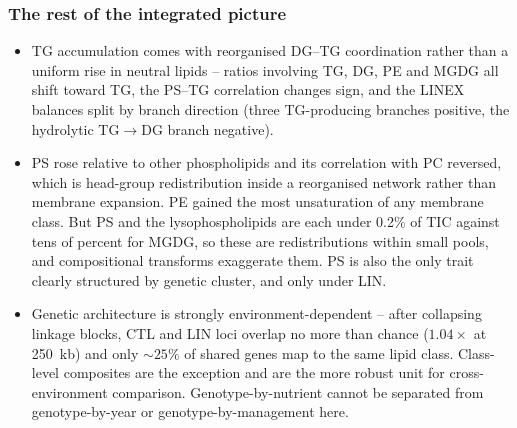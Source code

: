 \documentclass[11pt]{article}
\begin{document}
\subsubsection*{The rest of the integrated picture}
\begin{itemize}
  \item TG accumulation comes with reorganised DG--TG coordination rather than a
        uniform rise in neutral lipids -- ratios involving TG, DG, PE and MGDG all
        shift toward TG, the PS--TG correlation changes sign, and the LINEX
        balances split by branch direction (three TG-producing branches positive,
        the hydrolytic TG$\rightarrow$DG branch negative).
  \item PS rose relative to other phospholipids and its correlation with PC
        reversed, which is head-group redistribution inside a reorganised network
        rather than membrane expansion. PE gained the most unsaturation of any
        membrane class. But PS and the lysophospholipids are each under 0.2\% of
        TIC against tens of percent for MGDG, so these are redistributions within
        small pools, and compositional transforms exaggerate them. PS is also the
        only trait clearly structured by genetic cluster, and only under LIN.
  \item Genetic architecture is strongly environment-dependent -- after collapsing
        linkage blocks, CTL and LIN loci overlap no more than chance
        ($1.04\times$ at 250~kb) and only ${\sim}25\%$ of shared genes map to the
        same lipid class. Class-level composites are the exception and are the
        more robust unit for cross-environment comparison. Genotype-by-nutrient
        cannot be separated from genotype-by-year or genotype-by-management here.
\end{itemize}
\end{document}
